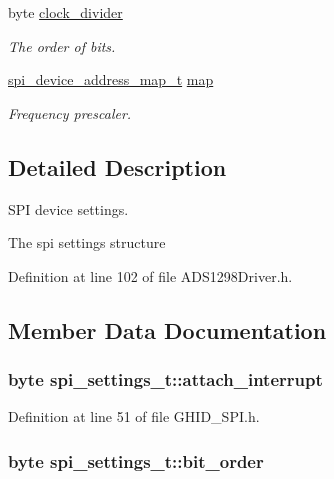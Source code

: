 \begin{DoxyCompactItemize}
byte \hyperlink{structspi__settings__t_a3f4596147a36610d8173f4d8d9655a0b}{clock\-\_\-divider}
\begin{DoxyCompactList}\small\item\em \-The order of bits. \end{DoxyCompactList}\item 
\hyperlink{_g_h_i_d___s_p_i_8h_a9d51766baec84fc8f27a377fb7a1ace7}{spi\-\_\-device\-\_\-address\-\_\-map\-\_\-t} \hyperlink{structspi__settings__t_a177d7128802b522adf4b1b9748787fb5}{map}
\begin{DoxyCompactList}\small\item\em \-Frequency prescaler. \end{DoxyCompactList}\end{DoxyCompactItemize}


\subsection{\-Detailed \-Description}
\-S\-P\-I device settings. 

\-The spi settings structure 

\-Definition at line 102 of file \-A\-D\-S1298\-Driver.\-h.



\subsection{\-Member \-Data \-Documentation}
\hypertarget{structspi__settings__t_aae2ae572e8d94487413f68c2ed08295d}{
\subsubsection[{attach\-\_\-interrupt}]{\setlength{\rightskip}{0pt plus 5cm}byte {\bf spi\-\_\-settings\-\_\-t\-::attach\-\_\-interrupt}}}\label{structspi__settings__t_aae2ae572e8d94487413f68c2ed08295d}


\-Definition at line 51 of file \-G\-H\-I\-D\-\_\-\-S\-P\-I.\-h.

\hypertarget{structspi__settings__t_ab50d718a4ec202c4077ad3c5170f0864}{
\subsubsection[{bit\-\_\-order}]{\setlength{\rightskip}{0pt plus 5cm}byte {\bf spi\-\_\-settings\-\_\-t\-::bit\-\_\-order}}}\label{structspi__settings__t_ab50d718a4ec202c4077ad3c5170f0864}


